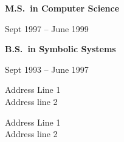 \documentclass[10pt,a4paper,ragged2e,withhyper]{altacv}
\renewcommand{\cvevent}[4]{%
  \textbf{#1} %
  \hfill %
  \begin{minipage}[t]{.5\linewidth}
    \raggedleft %
    \small#3 %
    \\ %
    #4 %
  \end{minipage}
  \vspace{\baselineskip} %
}
\begin{document}
\divider




\cvevent{M.S.\ in Computer Science}{Stanford University}{Sept 1997 -- June 1999}{}

\divider

\cvevent{B.S.\ in Symbolic Systems}{Stanford University}{Sept 1993 -- June 1997}{}

\newpage


{Address Line 1\\Address line 2}

\divider

{Address Line 1\\Address line 2}
\end{document}
